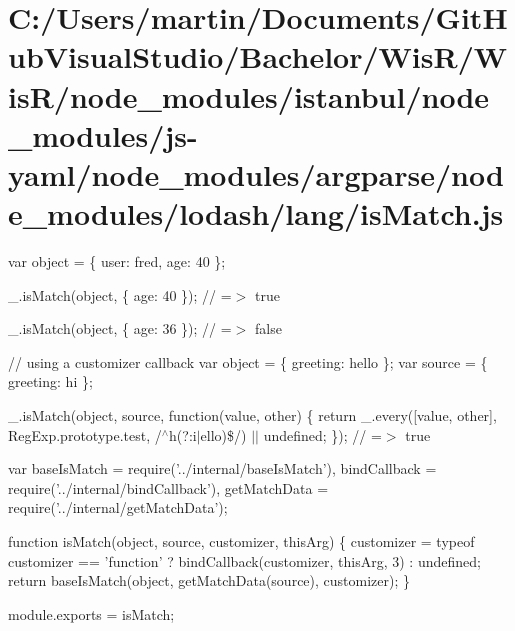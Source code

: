 \hypertarget{_c_1_2_users_2martin_2_documents_2_git_hub_visual_studio_2_bachelor_2_wis_r_2_wis_r_2node_moduleebfce5748877c5ea3f07a11e39bbc28e}{}\section{C\+:/\+Users/martin/\+Documents/\+Git\+Hub\+Visual\+Studio/\+Bachelor/\+Wis\+R/\+Wis\+R/node\+\_\+modules/istanbul/node\+\_\+modules/js-\/yaml/node\+\_\+modules/argparse/node\+\_\+modules/lodash/lang/is\+Match.\+js}
var object = \{ \textquotesingle{}user\textquotesingle{}\+: \textquotesingle{}fred\textquotesingle{}, \textquotesingle{}age\textquotesingle{}\+: 40 \};

\+\_\+.\+is\+Match(object, \{ \textquotesingle{}age\textquotesingle{}\+: 40 \}); // =$>$ true

\+\_\+.\+is\+Match(object, \{ \textquotesingle{}age\textquotesingle{}\+: 36 \}); // =$>$ false

// using a customizer callback var object = \{ \textquotesingle{}greeting\textquotesingle{}\+: \textquotesingle{}hello\textquotesingle{} \}; var source = \{ \textquotesingle{}greeting\textquotesingle{}\+: \textquotesingle{}hi\textquotesingle{} \};

\+\_\+.\+is\+Match(object, source, function(value, other) \{ return \+\_\+.\+every(\mbox{[}value, other\mbox{]}, Reg\+Exp.\+prototype.\+test, /$^\wedge$h(?\+:i$\vert$ello)\$/) $\vert$$\vert$ undefined; \}); // =$>$ true


\begin{DoxyCodeInclude}
var baseIsMatch = require(\textcolor{stringliteral}{'../internal/baseIsMatch'}),
    bindCallback = require(\textcolor{stringliteral}{'../internal/bindCallback'}),
    getMatchData = require(\textcolor{stringliteral}{'../internal/getMatchData'});

\textcolor{keyword}{function} isMatch(\textcolor{keywordtype}{object}, source, customizer, thisArg) \{
  customizer = typeof customizer == \textcolor{stringliteral}{'function'} ? bindCallback(customizer, thisArg, 3) : undefined;
  \textcolor{keywordflow}{return} baseIsMatch(\textcolor{keywordtype}{object}, getMatchData(source), customizer);
\}

module.exports = isMatch;
\end{DoxyCodeInclude}
 